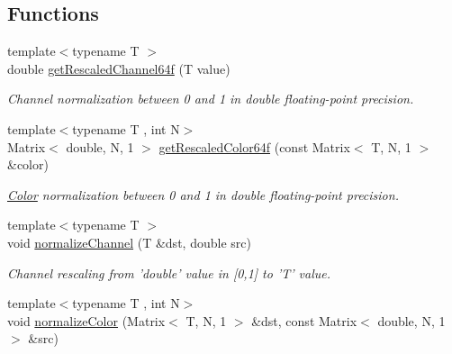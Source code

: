 \subsection*{Functions}
\begin{DoxyCompactItemize}
\item 
\hypertarget{group___color_conversion_ga3e86b8eff1da0324f3aee0cef19b7d68}{{\footnotesize template$<$typename T $>$ }\\double \hyperlink{group___color_conversion_ga3e86b8eff1da0324f3aee0cef19b7d68}{get\-Rescaled\-Channel64f} (T value)}\label{group___color_conversion_ga3e86b8eff1da0324f3aee0cef19b7d68}

\begin{DoxyCompactList}\small\item\em Channel normalization between 0 and 1 in double floating-\/point precision. \end{DoxyCompactList}\item 
\hypertarget{group___color_conversion_ga77f1b557bb4f33fac18948fcd9178dd7}{{\footnotesize template$<$typename T , int N$>$ }\\Matrix$<$ double, N, 1 $>$ \hyperlink{group___color_conversion_ga77f1b557bb4f33fac18948fcd9178dd7}{get\-Rescaled\-Color64f} (const Matrix$<$ T, N, 1 $>$ \&color)}\label{group___color_conversion_ga77f1b557bb4f33fac18948fcd9178dd7}

\begin{DoxyCompactList}\small\item\em \hyperlink{class_d_o_1_1_color}{Color} normalization between 0 and 1 in double floating-\/point precision. \end{DoxyCompactList}\item 
\hypertarget{group___color_conversion_gaf2f95805ffea57b546cf2547806aae1b}{{\footnotesize template$<$typename T $>$ }\\void \hyperlink{group___color_conversion_gaf2f95805ffea57b546cf2547806aae1b}{normalize\-Channel} (T \&dst, double src)}\label{group___color_conversion_gaf2f95805ffea57b546cf2547806aae1b}

\begin{DoxyCompactList}\small\item\em Channel rescaling from 'double' value in \mbox{[}0,1\mbox{]} to 'T' value. \end{DoxyCompactList}\item 
\hypertarget{group___color_conversion_ga2d242024d4f8c533e01ffd1f231adf7a}{{\footnotesize template$<$typename T , int N$>$ }\\void \hyperlink{group___color_conversion_ga2d242024d4f8c533e01ffd1f231adf7a}{normalize\-Color} (Matrix$<$ T, N, 1 $>$ \&dst, const Matrix$<$ double, N, 1 $>$ \&src)}\label{group___color_conversion_ga2d242024d4f8c533e01ffd1f231adf7a}


\end{DoxyCompactItemize}
